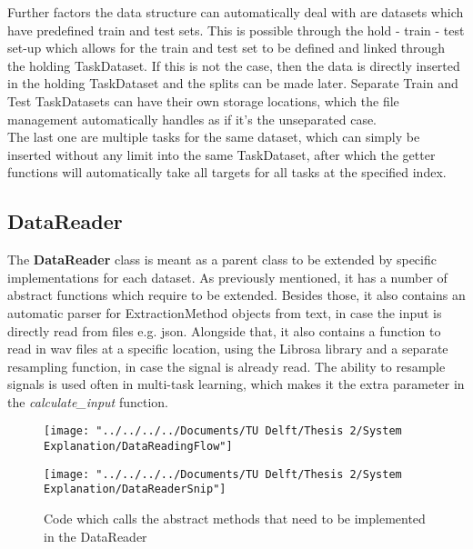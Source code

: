 Further factors the data structure can automatically deal with are datasets which have predefined train and test sets. This is possible through the hold - train - test set-up which allows for the train and test set to be defined and linked through the holding TaskDataset. If this is not the case, then the data is directly inserted in the holding TaskDataset and the splits can be made later. Separate Train and Test TaskDatasets can have their own storage locations, which the file management automatically handles as if it's the unseparated case.\\

The last one are multiple tasks for the same dataset, which can simply be inserted without any limit into the same TaskDataset, after which the getter functions will automatically take all targets for all tasks at the specified index. \\

\subsection{DataReader} \label{Impl:DataRead:DataReader}


The \textbf{DataReader} class is meant as a parent class to be extended by specific implementations for each dataset. As previously mentioned, it has a number of abstract functions which require to be extended. Besides those, it also contains an automatic parser for ExtractionMethod objects from text, in case the input is directly read from files e.g. json. Alongside that, it also contains a function to read in wav files at a specific location, using the Librosa library and a separate resampling function, in case the signal is already read. The ability to resample signals is used often in multi-task learning, which makes it the extra parameter in the \textit{calculate\_input} function.

\begin{figure}
	\centering
	\texttt{[image: "../../../../Documents/TU Delft/Thesis 2/System Explanation/DataReadingFlow"]}
	\caption{}
	\label{fig:datareadingflow}
\end{figure}

\begin{figure}
	\centering
	\texttt{[image: "../../../../Documents/TU Delft/Thesis 2/System Explanation/DataReaderSnip"]}
	\caption{Code which calls the abstract methods that need to be implemented in the DataReader}
	\label{fig:datareadersnip}
\end{figure}


